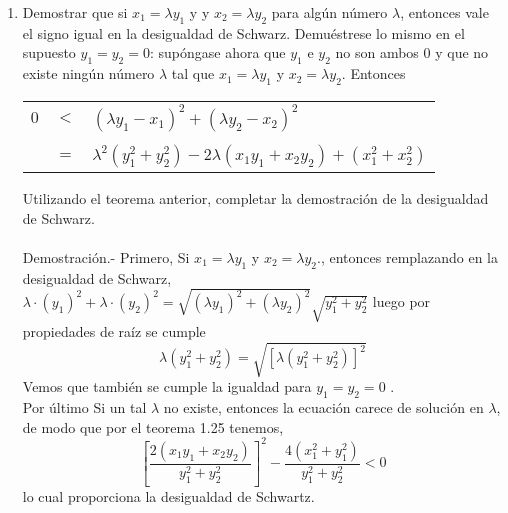 \begin{enumerate}[\bfseries 1.]
\begin{enumerate}[\bfseries (a)]
\item Demostrar que si $x_1=\lambda y_1$ \; y \; y $x_2=\lambda y_2$ para algún número $\lambda$, entonces vale el signo igual en la desigualdad de Schwarz. Demuéstrese lo mismo en el supuesto $y_1=y_2=0$: supóngase ahora que $y_1$ e $y_2$ no son ambos $0$ y que no existe ningún número $\lambda$ tal que $x_1=\lambda y_1$ \; y \; $x_2=\lambda y_2.$ Entonces
\begin{center}
\begin{tabular}{r c l}
$0$&$<$&$(\lambda y_1-x_1)^2+(\lambda y_2 -x_2)^2$\\\\
&$=$&$\lambda^2(y_1^2+y_2^2)-2\lambda(x_1 y_1 + x_2 y_2)+(x_1^2 +x_2^2)$\\
\end{tabular}
\end{center}
Utilizando el teorema anterior, completar la demostración de la desigualdad de Schwarz.\\\\
Demostración.- \; Primero, Si $x_1=\lambda y_1$ \; y \; $x_2=\lambda y_2.$, entonces remplazando en la desigualdad de Schwarz, $\lambda \cdot (y_1)^2 + \lambda \cdot (y_2)^2=\sqrt{(\lambda y_1)^2+(\lambda y_2)^2}\sqrt{y_1^2+y_2^2}$ luego por propiedades de raíz se cumple  $$\lambda(y_1^2+y_2^2) = \sqrt{\left[\lambda(y_1^2+y_2^2)\right]^2}$$
Vemos que también se cumple la igualdad para $y_1=y_2=0$ .\\
Por último Si un tal $\lambda$ no existe, entonces la ecuación carece de solución en $\lambda$, de modo que por el teorema 1.25 tenemos, $$\left[ \dfrac{2(x_1 y_1 + x_2 y_2)}{y_1^2 + y_2^2}  \right]^2 - \dfrac{4(x_1^2 +y_1^2)}{y_1^2 + y_2^2}<0$$ lo cual proporciona la desigualdad de Schwartz.\\\\


\end{enumerate}
\end{enumerate}
